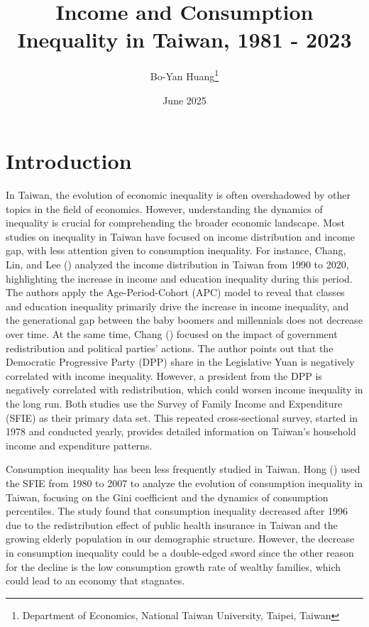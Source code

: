 \documentclass{article}
\title{Income and Consumption Inequality in Taiwan, 1981 - 2023}
\author{Bo-Yan Huang\footnote{Department of Economics, National Taiwan University, Taipei, Taiwan}}
\date{June 2025}
\begin{document}
\maketitle

\section{Introduction}
\label{sec:introduction}

In Taiwan, the evolution of economic inequality is often overshadowed by other topics in the field of economics.
However, understanding the dynamics of inequality is crucial for comprehending the broader economic landscape. 
Most studies on inequality in Taiwan have focused on income distribution and income gap, with less attention given to consumption inequality.
For instance, Chang, Lin, and Lee (\citeyear{TW_classes_inc}) analyzed the income distribution in Taiwan from 1990 to 2020, highlighting the increase in income and education inequality during this period.
The authors apply the Age-Period-Cohort (APC) model to reveal that classes and education inequality primarily drive the increase in income inequality, and the generational gap between the baby boomers and millennials does not decrease over time. 
At the same time, Chang (\citeyear{TW_party_inc_ineq}) focused on the impact of government redistribution and political parties' actions.
The author points out that the Democratic Progressive Party (DPP) share in the Legislative Yuan is negatively correlated with income inequality. However, a president from the DPP is negatively correlated with redistribution, which could worsen income inequality in the long run.
Both studies use the Survey of Family Income and Expenditure (SFIE) as their primary data set. This repeated cross-sectional survey, started in 1978 and conducted yearly, provides detailed information on Taiwan's household income and expenditure patterns.

Consumption inequality has been less frequently studied in Taiwan. Hong (\citeyear{TW_consumption_inequality}) used the SFIE from 1980 to 2007 to analyze the evolution of consumption inequality in Taiwan, focusing on the Gini coefficient and the dynamics of consumption percentiles. 
The study found that consumption inequality decreased after 1996 due to the redistribution effect of public health insurance in Taiwan and the growing elderly population in our demographic structure.
However, the decrease in consumption inequality could be a double-edged sword since the other reason for the decline is the low consumption growth rate of wealthy families, which could lead to an economy that stagnates.
\end{document}
